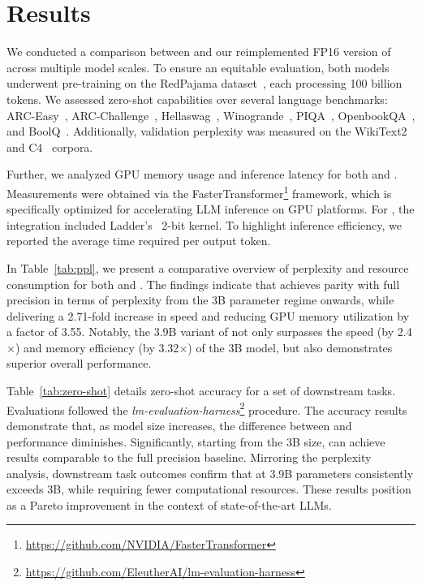 \section{Results}

We conducted a comparison between  and our reimplemented FP16 version of  across multiple model scales. To ensure an equitable evaluation, both models underwent pre-training on the RedPajama dataset~\cite{redpajama}, each processing 100 billion tokens. We assessed zero-shot capabilities over several language benchmarks: ARC-Easy~\cite{arc}, ARC-Challenge~\cite{arc}, Hellaswag~\cite{hellaswag}, Winogrande~\cite{winoGrande}, PIQA~\cite{piqa}, OpenbookQA~\cite{openbookqa}, and BoolQ~\cite{boolq}. Additionally, validation perplexity was measured on the WikiText2~\cite{wikitext2} and C4~\cite{c4} corpora.

Further, we analyzed GPU memory usage and inference latency for both  and . Measurements were obtained via the FasterTransformer\footnote{\url{https://github.com/NVIDIA/FasterTransformer}} framework, which is specifically optimized for accelerating LLM inference on GPU platforms. For , the integration included Ladder's~\cite{ladder} 2-bit kernel. To highlight inference efficiency, we reported the average time required per output token.

In Table~\ref{tab:ppl}, we present a comparative overview of perplexity and resource consumption for both  and . The findings indicate that  achieves parity with full precision  in terms of perplexity from the 3B parameter regime onwards, while delivering a 2.71-fold increase in speed and reducing GPU memory utilization by a factor of 3.55. Notably, the 3.9B variant of  not only surpasses the speed (by 2.4$\times$) and memory efficiency (by 3.32$\times$) of the  3B model, but also demonstrates superior overall performance.

Table~\ref{tab:zero-shot} details zero-shot accuracy for a set of downstream tasks. Evaluations followed the \emph{lm-evaluation-harness}\footnote{\url{https://github.com/EleutherAI/lm-evaluation-harness}} procedure. The accuracy results demonstrate that, as model size increases, the difference between  and  performance diminishes. Significantly, starting from the 3B size,  can achieve results comparable to the full precision baseline. Mirroring the perplexity analysis, downstream task outcomes confirm that  at 3.9B parameters consistently exceeds  3B, while requiring fewer computational resources. These results position  as a Pareto improvement in the context of state-of-the-art LLMs.

